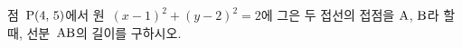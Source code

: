 점~$\mathrm{P}(4,\,5)$에서 원~$(x-1)^2+(y-2)^2=2$에 그은 두 접선의 접점을 $\mathrm{A}$, $\mathrm{B}$라 할 때, 선분~$\mathrm{AB}$의 길이를 구하시오.
